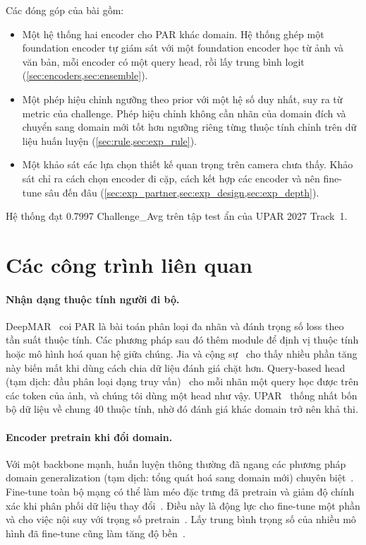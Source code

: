 \documentclass[10pt,twocolumn,letterpaper]{article}
\begin{document}
Các đóng góp của bài gồm:
\begin{itemize}
\item Một hệ thống hai encoder cho PAR khác domain. Hệ thống ghép một foundation encoder tự giám sát với một foundation encoder học từ ảnh và văn bản, mỗi encoder có một query head, rồi lấy trung bình logit (\cref{sec:encoders,sec:ensemble}).
\item Một phép hiệu chỉnh ngưỡng theo prior với một hệ số duy nhất, suy ra từ metric của challenge. Phép hiệu chỉnh không cần nhãn của domain đích và chuyển sang domain mới tốt hơn ngưỡng riêng từng thuộc tính chỉnh trên dữ liệu huấn luyện (\cref{sec:rule,sec:exp_rule}).
\item Một khảo sát các lựa chọn thiết kế quan trọng trên camera chưa thấy. Khảo sát chỉ ra cách chọn encoder đi cặp, cách kết hợp các encoder và nên fine-tune sâu đến đâu (\cref{sec:exp_partner,sec:exp_design,sec:exp_depth}).
\end{itemize}
Hệ thống đạt 0.7997 Challenge\_Avg trên tập test ẩn của UPAR 2027 Track~1.

\section{Các công trình liên quan}
\label{sec:related}

\paragraph{Nhận dạng thuộc tính người đi bộ.} DeepMAR~\cite{deepmar} coi PAR là bài toán phân loại đa nhãn và đánh trọng số loss theo tần suất thuộc tính. Các phương pháp sau đó thêm module để định vị thuộc tính hoặc mô hình hoá quan hệ giữa chúng. Jia và cộng sự~\cite{rethinkpar} cho thấy nhiều phần tăng này biến mất khi dùng cách chia dữ liệu đánh giá chặt hơn. Query-based head (tạm dịch: đầu phân loại dạng truy vấn)~\cite{q2l,mldecoder} cho mỗi nhãn một query học được trên các token của ảnh, và chúng tôi dùng một head như vậy. UPAR~\cite{upar} thống nhất bốn bộ dữ liệu về chung 40 thuộc tính, nhờ đó đánh giá khác domain trở nên khả thi.

\paragraph{Encoder pretrain khi đổi domain.} Với một backbone mạnh, huấn luyện thông thường đã ngang các phương pháp domain generalization (tạm dịch: tổng quát hoá sang domain mới) chuyên biệt~\cite{domainbed}. Fine-tune toàn bộ mạng có thể làm méo đặc trưng đã pretrain và giảm độ chính xác khi phân phối dữ liệu thay đổi~\cite{lpft}. Điều này là động lực cho fine-tune một phần và cho việc nội suy với trọng số pretrain~\cite{wiseft}. Lấy trung bình trọng số của nhiều mô hình đã fine-tune cũng làm tăng độ bền~\cite{soups,diwa}.
\end{document}
